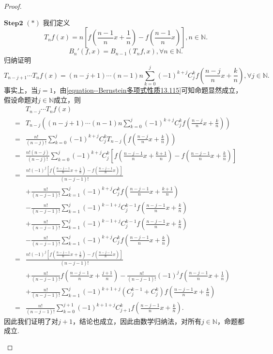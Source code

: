 \documentclass[../../main.tex]{subfiles}
\begin{document}
\begin{proof}
\begin{enumerate}[(1)]
$\mathbf{Step}\mathbf{2}$ \((*)\) 我们定义
\[
T_nf(x)=n\left[f\left(\frac{n - 1}{n}x+\frac{1}{n}\right)-f\left(\frac{n - 1}{n}x\right)\right],n\in\mathbb{N}.
\]
\[
B_n'(f,x)=B_{n - 1}(T_nf,x),\forall n\in\mathbb{N}.
\]
归纳证明
\[
T_{n - j + 1}\cdots T_nf(x)=(n - j + 1)\cdots(n - 1)n\sum_{k = 0}^j(-1)^{k + j}C_j^kf\left(\frac{n - j}{n}x+\frac{k}{n}\right),\forall j\in\mathbb{N}.
\]
事实上，当\(j = 1\)，由\eqref{equation--Bernstein多项式性质13.115}可知命题显然成立，假设命题对\(j\in\mathbb{N}\)成立，则
\begin{align*}
&T_{n - j}\cdots T_nf(x)\\
=&T_{n - j}\left((n - j + 1)\cdots(n - 1)n\sum_{k = 0}^j(-1)^{k + j}C_j^kf\left(\frac{n - j}{n}x+\frac{k}{n}\right)\right)\\
=&\frac{n!}{(n - j)!}\sum_{k = 0}^j(-1)^{k + j}C_j^kT_{n - j}\left(f\left(\frac{n - j}{n}x+\frac{k}{n}\right)\right)\\
=&\frac{n!(n - j)}{(n - j)!}\sum_{k = 0}^j(-1)^{k + j}C_j^k\left[f\left(\frac{n - j - 1}{n}x+\frac{k + 1}{n}\right)-f\left(\frac{n - j - 1}{n}x+\frac{k}{n}\right)\right]\\
=&\frac{n!(-1)^j\left[f\left(\frac{n - j - 1}{n}x+\frac{1}{n}\right)-f\left(\frac{n - j - 1}{n}x\right)\right]}{(n - j - 1)!}\\
&+\frac{n!}{(n - j - 1)!}\sum_{k = 1}^j(-1)^{k + j}C_j^kf\left(\frac{n - j - 1}{n}x+\frac{k + 1}{n}\right)\\
&-\frac{n!}{(n - j - 1)!}\sum_{k = 1}^j(-1)^{k - 1 + j}C_j^{k - 1}f\left(\frac{n - j - 1}{n}x+\frac{k}{n}\right)\\
&+\frac{n!}{(n - j - 1)!}\sum_{k = 1}^j(-1)^{k - 1 + j}C_j^{k - 1}f\left(\frac{n - j - 1}{n}x+\frac{k}{n}\right)\\
&-\frac{n!}{(n - j - 1)!}\sum_{k = 1}^j(-1)^{k + j}C_j^kf\left(\frac{n - j - 1}{n}x+\frac{k}{n}\right)\\
=&\frac{n!(-1)^j\left[f\left(\frac{n - j - 1}{n}x+\frac{1}{n}\right)-f\left(\frac{n - j - 1}{n}x\right)\right]}{(n - j - 1)!}\\
&+\frac{n!}{(n - j - 1)!}f\left(\frac{n - j - 1}{n}x+\frac{j + 1}{n}\right)-\frac{n!}{(n - j - 1)!}(-1)^jf\left(\frac{n - j - 1}{n}x+\frac{1}{n}\right)\\
&+\frac{n!}{(n - j - 1)!}\sum_{k = 1}^{j}(-1)^{k + 1 + j}(C_j^{k - 1}+C_j^k)f\left(\frac{n - j - 1}{n}x+\frac{k}{n}\right)\\
=&\frac{n!}{(n - j - 1)!}\sum_{k = 0}^{j + 1}(-1)^{k + 1 + j}C_{j + 1}^kf\left(\frac{n - j - 1}{n}x+\frac{k}{n}\right).
\end{align*}
因此我们证明了对\(j + 1\)，结论也成立，因此由数学归纳法，对所有\(j\in\mathbb{N}\)，命题都成立.


\end{enumerate}
\end{proof}
\end{document}
